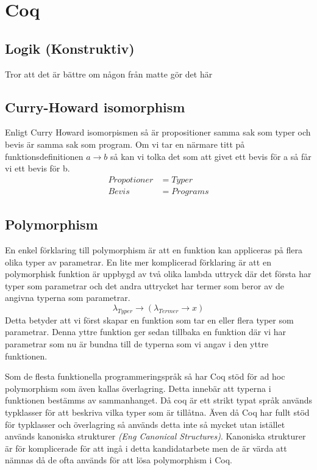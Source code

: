 \section{Coq}

\subsection{Logik (Konstruktiv)}
Tror att det är bättre om någon från matte gör det här

\subsection{Curry-Howard isomorphism}
Enligt Curry Howard isomorpismen så är propositioner samma sak som typer och
bevis är samma sak som program. Om vi tar en närmare titt på
funktionsdefinitionen $a \rightarrow b$ så kan vi tolka det som att givet ett
bevis för a så får vi ett bevis för b.
\begin{align*}
  Propotioner &= Typer \\
  Bevis       &= Programs
\end{align*}

\subsection{Polymorphism}
En enkel förklaring till polymorphism är att en funktion kan appliceras på
flera olika typer av parametrar. En lite mer komplicerad förklaring är att en
polymorphisk funktion är uppbygd av två olika lambda uttryck där det första har
typer som parametrar och det andra uttrycket har termer som beror av de angivna
typerna som parametrar.
\begin{equation}
  \lambda_{Typer} \rightarrow (\lambda_{Termer} \rightarrow x)
  \label{polymorphsk funktion}
\end{equation}
Detta betyder att vi först skapar en funktion som tar en eller flera
typer som parametrar. Denna yttre funktion ger sedan tillbaka en funktion
där vi har parametrar som nu är bundna till de typerna som vi angav i den
yttre funktionen.

Som de flesta funktionella programmeringspråk så har Coq stöd för ad hoc
polymorphism som även kallas överlagring. Detta innebär att typerna i
funktionen bestämms av sammanhanget. Då coq är ett strikt typat språk används
typklasser för att beskriva vilka typer som är tillåtna. Även då Coq har fullt
stöd för typklasser och överlagring så används detta inte så mycket utan
istället används kanoniska strukturer {\it (Eng Canonical Structures)}.
Kanoniska strukturer är för komplicerade för att ingå i detta kandidatarbete
men de är värda att nämnas då de ofta används för att lösa polymorphism i Coq.

